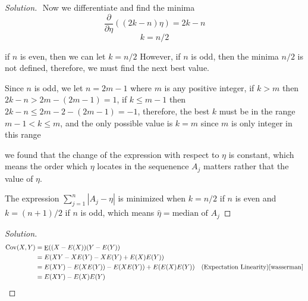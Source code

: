 \documentclass{article}
\newenvironment{solution}
  {\renewcommand\qedsymbol{$\blacksquare$}\begin{proof}[Solution]$ $}
  {\end{proof}}
\DeclareMathOperator{\Cov}{Cov}
\DeclareMathOperator{\E}{E}
\begin{document}
\begin{Exercise}
\begin{solution}
        Now we differentiate and find the minima
        \[\frac{\partial}{\partial \eta}((2k-n)\eta) = 2k-n\]
        \[k = n/2\]

        if \(n\) is even, then we can let \(k=n/2\)
        However, if \(n\) is odd, then the minima \(n/2\) is not defined, therefore, we must find the next best value.

        Since \(n\) is odd, we let \(n=2m-1\) where \(m\) is any positive integer, if \(k>m\) then \(2k-n > 2m - (2m-1) = 1\), if \(k\le m-1\) then \(2k-n \le 2m - 2 - (2m-1) = -1\), therefore, the best \(k\) must be in the range \(m-1 < k \le m\), and the only possible value is \(k=m\) since \(m\) is only integer in this range


        we found that the change of the expression with respect to \(\eta\) is constant, which means the order which \(\eta\) locates in the sequenence \(A_j\) matters rather that the value of \(\eta\).

        The expression \(\sum_{j=1}^{n}|A_j -\eta|\) is minimized when \(k=n/2\) if \(n\) is even and \(k=(n+1)/2\) if \(n\) is odd, which means \(\hat \eta = \text{median of }A_j\)
    \end{solution}
\end{Exercise}
\pagebreak
\begin{Exercise}
    \begin{solution}
        \begin{align*}
            \Cov(X,Y) & = \E((X-E(X))(Y-E(Y))                                                                      \\
                      & = E(XY - XE(Y) - XE(Y)+E(X)E(Y))                                                           \\
                      & = E(XY) - E(XE(Y)) - E(XE(Y))+E(E(X)E(Y)) & \text{(Expectation Linearity)\cite{wasserman}} \\
                      & = E(XY) - E(X)E(Y)                                                                         \\
        \end{align*}
    \end{solution}
\end{Exercise}
\pagebreak
\end{document}
